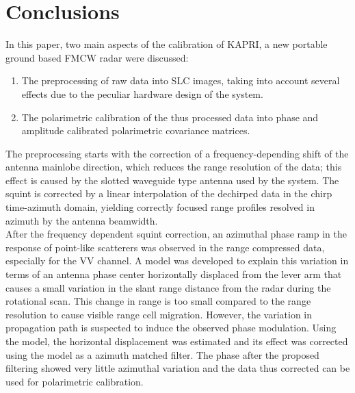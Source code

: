 \section{Conclusions}\label{sec:conclusions}
In this paper, two main aspects of the calibration of KAPRI, a new portable ground based FMCW radar were discussed:
\begin{enumerate}
	\item The preprocessing of raw data into SLC images, taking into account several effects due to the peculiar hardware design of the system.
	\item The polarimetric calibration of the thus processed data into phase and amplitude calibrated polarimetric covariance matrices.
\end{enumerate}
The preprocessing starts with the correction of a frequency-depending shift of the antenna mainlobe direction, which reduces the range resolution of the data; this effect is caused by the slotted waveguide type antenna used by the system. The squint is corrected by a linear interpolation of the dechirped data in the chirp time-azimuth domain, yielding correctly focused range profiles resolved in azimuth by the antenna beamwidth.\\
After the frequency dependent squint correction, an azimuthal phase ramp in the response of point-like scatterers was observed in the range compressed data, especially for the VV channel. A model was developed to explain this variation in terms of an antenna phase center horizontally displaced from the lever arm that causes a small variation in the slant range distance from the radar during the rotational scan. This change in range is too small compared to the range resolution to cause visible range cell migration. However, the variation in propagation path is suspected to induce the observed phase modulation. Using the model, the horizontal displacement was estimated and its effect was corrected using the model as a azimuth matched filter. The phase after the proposed filtering showed very little azimuthal variation and the data thus corrected can be used for polarimetric calibration.\\
